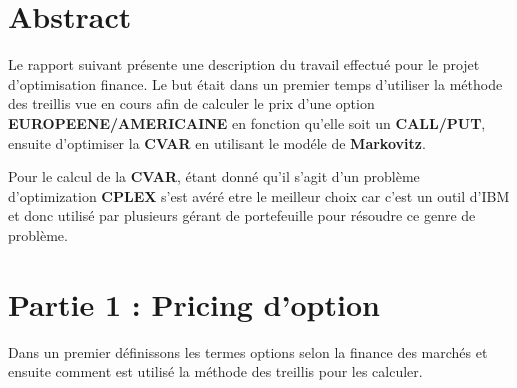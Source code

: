 \documentclass[12pt]{article}
\theoremstyle{definition}
\theoremstyle{definition}
\begin{document}



\newpage
\section*{Abstract}

Le rapport suivant présente une description du travail effectué pour le projet d'optimisation 
finance. Le but était dans un premier temps d'utiliser la méthode des treillis vue en cours afin de calculer le prix d'une option \textbf{EUROPEENE/AMERICAINE} en fonction qu'elle soit un \textbf{CALL/PUT}, ensuite d'optimiser la \textbf{CVAR} en utilisant le modéle de \textbf{Markovitz}. 


Pour le calcul de la \textbf{CVAR}, étant donné qu'il s'agit d'un problème d'optimization \textbf{CPLEX} s'est avéré etre le meilleur choix car c'est un outil d'IBM et donc utilisé par plusieurs gérant de portefeuille pour résoudre ce genre de problème.


\newpage
\section{Partie 1 : Pricing d'option}

Dans un premier définissons les termes options selon la finance des marchés et ensuite comment est utilisé la méthode des treillis pour les calculer.
\end{document}
